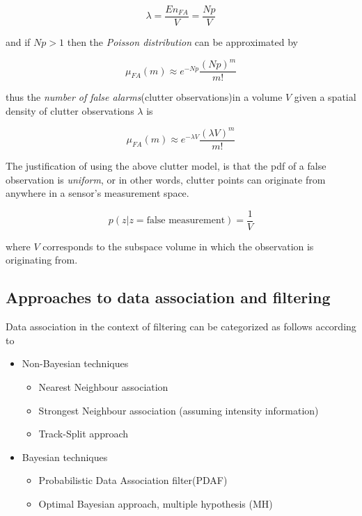 $$
\lambda = \frac{E{n_{FA}}}{V} = \frac{Np}{V}
$$


and if $Np >1$ then the \emph{Poisson distribution} can be approximated by 

\begin{equation}\label{eq:poisson}
\mu_{FA}(m) \approx e^{-Np}\frac{(Np)^m}{m!}
\end{equation}


thus the \emph{number of false alarms}(clutter observations)in a volume $V$ given a spatial density of clutter observations $\lambda$ is

$$
\mu_{FA}(m) \approx e^{-\lambda V}\frac{(\lambda V)^m}{m!}
$$

The justification of using the above clutter model, is that the pdf of a false observation  is \emph{uniform}, or in other words, clutter points can originate from anywhere in a sensor's measurement space.


$$
p(z|{z = \text{false measurement}}) = \frac{1}{V}
$$


where $V$ corresponds to the subspace volume in which the observation is originating from.

\subsection{Approaches to data association and filtering}

Data association in the context of filtering can be categorized as follows according to \cite{Shalom1995}

\begin{itemize}
	\item Non-Bayesian techniques
	\begin{itemize}
		\item Nearest Neighbour association
		\item Strongest Neighbour association (assuming intensity information)
		\item Track-Split approach
	\end{itemize}
	
	\item Bayesian techniques
	\begin{itemize}
		\item Probabilistic Data Association filter(PDAF)
		\item Optimal Bayesian approach, multiple hypothesis (MH)
	\end{itemize}

\end{itemize}

